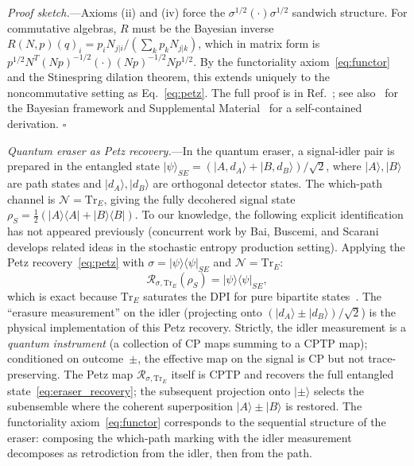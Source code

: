 \documentclass[prl,twocolumn,superscriptaddress,longbibliography,floatfix]{revtex4-2}
\newcommand{\Tr}{\mathrm{Tr}}
\newcommand{\Petz}{\mathcal{R}}
\newcommand{\chan}{\mathcal{N}}
\newcommand{\ket}[1]{|#1\rangle}
\newcommand{\op}[2]{|#1\rangle\langle#2|}
\begin{document}
\emph{Proof sketch.}---Axioms (ii) and (iv) force the
$\sigma^{1/2}(\cdot)\sigma^{1/2}$ sandwich structure. For commutative
algebras, $R$ must be the Bayesian inverse
$R(N,p)(q)_i = p_i N_{j|i}/(\sum_k p_k N_{j|k})$, which in matrix
form is $p^{1/2} N^T (Np)^{-1/2} (\cdot) (Np)^{-1/2} N p^{1/2}$.
By the functoriality axiom~\eqref{eq:functor} and the Stinespring
dilation theorem, this extends uniquely to the noncommutative
setting as Eq.~\eqref{eq:petz}. The full proof is in
Ref.~\cite{Parzygnat2023}; see also~\cite{Fullwood2023} for the
Bayesian framework and Supplemental Material~\cite{SM} for a
self-contained derivation. \hfill$\square$

\emph{Quantum eraser as Petz recovery.}---In the quantum eraser, a
signal-idler pair is prepared in the entangled state
$\ket{\psi}_{SE} = (\ket{A,d_A} + \ket{B,d_B})/\sqrt{2}$, where
$\ket{A},\ket{B}$ are path states and $\ket{d_A},\ket{d_B}$ are
orthogonal detector states. The which-path channel is
$\chan = \Tr_E$, giving the fully decohered signal state
$\rho_S = \frac{1}{2}(\op{A}{A} + \op{B}{B})$.
To our knowledge, the following explicit identification has not
appeared previously (concurrent work by Bai, Buscemi, and
Scarani~\cite{Buscemi2024} develops related ideas in the stochastic
entropy production setting).
Applying the Petz recovery~\eqref{eq:petz} with
$\sigma = \op{\psi}{\psi}_{SE}$ and $\chan = \Tr_E$:
\begin{equation}
\Petz_{\sigma,\Tr_E}(\rho_S) =
\op{\psi}{\psi}_{SE},
\label{eq:eraser_recovery}
\end{equation}
which is exact because $\Tr_E$ saturates the DPI for pure bipartite
states~\cite{SM}. The ``erasure measurement'' on the idler (projecting
onto $(\ket{d_A} \pm \ket{d_B})/\sqrt{2}$) is the physical
implementation of this Petz recovery.
Strictly, the idler measurement is a \emph{quantum instrument}
(a collection of CP maps summing to a CPTP map); conditioned on
outcome~$\pm$, the effective map on the signal is CP but not
trace-preserving. The Petz map $\Petz_{\sigma,\Tr_E}$ itself is
CPTP and recovers the full entangled state~\eqref{eq:eraser_recovery};
the subsequent projection onto $\ket{\pm}$ selects the subensemble
where the coherent superposition $\ket{A} \pm \ket{B}$ is restored.
The functoriality axiom~\eqref{eq:functor}
corresponds to the sequential structure of the
eraser: composing the which-path marking with the idler measurement
decomposes as retrodiction from the idler, then from the path.

\end{document}
